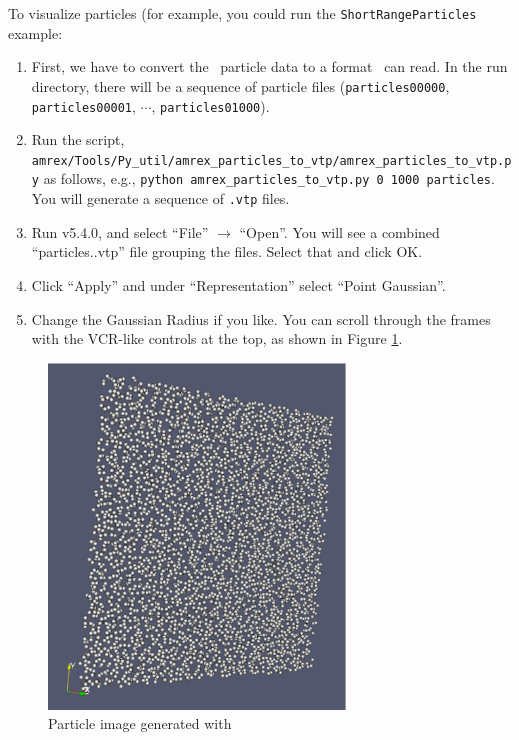 To visualize particles (for example, you could run the {\tt ShortRangeParticles} example:
\begin{enumerate}
\item First, we have to convert the \amrex\ particle data to a format \paraview\ can read.
      In the run directory, there will be a sequence of particle files ({\tt particles00000},
      {\tt particles00001}, $\cdots$, {\tt particles01000}).
\item Run the script,
      {\tt amrex/Tools/Py\_util/amrex\_particles\_to\_vtp/amrex\_particles\_to\_vtp.py}
      as follows, e.g.,
      {\tt python amrex\_particles\_to\_vtp.py 0 1000 particles}.  You will generate
      a sequence of {\tt .vtp} files.
\item Run \paraview v5.4.0, and select ``File'' $\rightarrow$ ``Open''.  You will see
      a combined ``particles..vtp'' file grouping the files.  Select that and click OK.
\item Click ``Apply'' and under ``Representation'' select ``Point Gaussian''.
\item Change the Gaussian Radius if you like.  You can scroll through the frames with the
      VCR-like controls at the top, as shown in Figure \ref{fig:ParaView_particles}.
\end{enumerate}


\begin{figure}[tb]
\centering
\includegraphics[width=3.1in]{./Visualization/ParaView_particles}
\caption{Particle image generated with \paraview}
\label{fig:ParaView_particles}
\end{figure}

\section{\yt}


